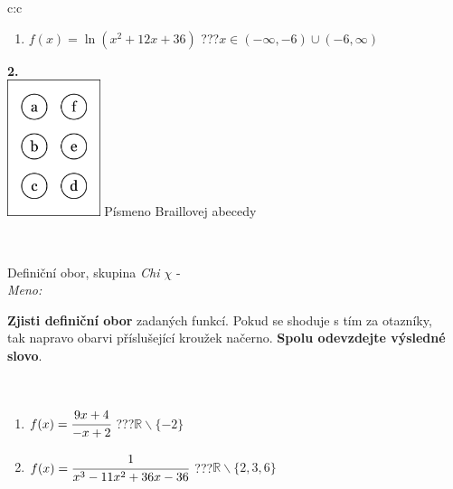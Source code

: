 \documentclass[10pt]{report}
\begin{document}
\begin{tabular}{c:c}
\begin{minipage}[c][104.5mm][t]{0.5\linewidth}
\begin{center}
\begin{minipage}{0.79\linewidth}
\begin{center}
\begin{varwidth}{\linewidth}
\begin{enumerate}
\item $f(x)=\ln{(x^2+12x+36)}$\quad \dotfill\; ???\;\dotfill \quad $x\in(-\infty , -6)\cup(-6 , \infty)$
\end{enumerate}
\end{varwidth}
\end{center}
\end{minipage}
\begin{minipage}{0.20\linewidth}
\begin{center}
{\Huge\bfseries 2.} \\[2mm]
\includegraphics[height=40mm]{../images/braille.png}
{\small Písmeno Braillovej abecedy}
\end{center}
\end{minipage}
\end{center}
\end{minipage}
\\ \hdashline
\begin{minipage}[c][104.5mm][t]{0.5\linewidth}
\begin{center}
\vspace{7mm}
{\huge Definiční obor, skupina \textit{Chi $\chi$} -}\\[5mm]
\textit{Meno:}\phantom{xxxxxxxxxxxxxxxxxxxxxxxxxxxxxxxxxxxxxxxxxxxxxxxxxxxxxxxxxxxxxxxxx}\\[5mm]
\begin{minipage}{0.95\linewidth}
\textbf{Zjisti definiční obor} zadaných funkcí. Pokud se shoduje s tím za otazníky,\\tak napravo obarvi příslušející kroužek načerno. \textbf{Spolu odevzdejte výsledné slovo}.
\end{minipage}
\\[1mm]
\begin{minipage}{0.79\linewidth}
\begin{center}
\begin{varwidth}{\linewidth}
\begin{enumerate}
\normalsizerrr
\item $f(x)=\cfrac{9x+4}{-x+2}$\quad \dotfill\; ???\;\dotfill \quad $\mathbb{R}\smallsetminus\{-2\}$
\item $f(x)=\cfrac{1}{x^3-11x^2+36x-36}$\quad \dotfill\; ???\;\dotfill \quad $\mathbb{R}\smallsetminus\{2,3,6\}$

\end{enumerate}
\end{varwidth}
\end{center}
\end{minipage}
\end{center}
\end{minipage}
\end{tabular}
\end{document}
